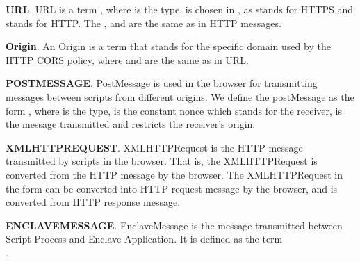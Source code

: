 \vspace{1mm}\noindent\textbf{URL}.
URL is a term , where  is the type,  is chosen in ,  as  stands for HTTPS and  stands for HTTP. The , and  are the same as in HTTP messages.

\vspace{1mm}\noindent\textbf{Origin}.
An Origin is a term  that stands for the specific domain used by the HTTP CORS policy, where  and  are the same as in URL.

\vspace{1mm}\noindent\textbf{POSTMESSAGE}.
PostMessage is used in the browser for transmitting messages between scripts from different origins. We define the postMessage as the form , where  is the type,  is the constant nonce which stands for the receiver,  is the message transmitted and  restricts the receiver's origin.

\vspace{1mm}\noindent\textbf{XMLHTTPREQUEST}.
XMLHTTPRequest is the HTTP message transmitted  by scripts in the browser. That is, the XMLHTTPRequest is converted from the HTTP message by the browser. The XMLHTTPRequest in the form  can be converted into HTTP request message by the browser, and   is converted from HTTP response message.

\vspace{1mm}\noindent\textbf{ENCLAVEMESSAGE}.
EnclaveMessage is the message transmitted between Script Process and Enclave Application. It is defined as the term \\ .


